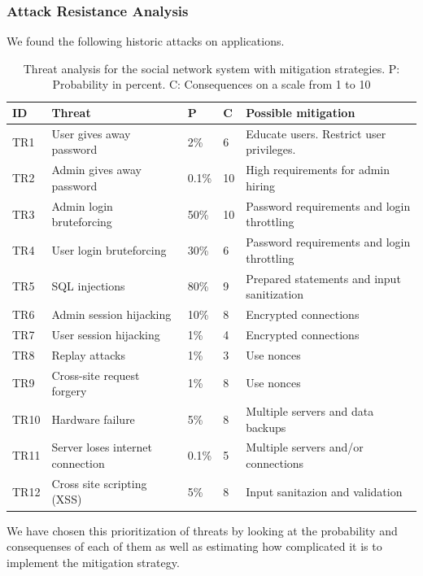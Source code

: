 \documentclass[a4paper]{article}
\begin{document}
\subsubsection{Attack Resistance Analysis}
We found the following historic attacks on applications.

\begin{table}[h!]
	\begin{tabular}{| l | p{4cm} | l | l | p{5cm} |}
		\hline
		\textbf{ID} & \textbf{Threat} & \textbf{P} & \textbf{C} & \textbf{Possible mitigation} \\ \hline
		TR1 & User gives away password & 2\% & 6 & Educate users. Restrict user privileges. \\ \hline
        TR2 & Admin gives away password & 0.1\%  & 10 & High requirements for admin hiring \\ \hline
        TR3 & Admin login bruteforcing & 50\% & 10 & Password requirements and login throttling \\ \hline
        TR4 & User login bruteforcing & 30\% & 6 & Password requirements and login throttling \\ \hline
        TR5 & SQL injections & 80\% & 9 & Prepared statements and input sanitization \\ \hline
        TR6 & Admin session hijacking & 10\% & 8 & Encrypted connections \\ \hline
        TR7 & User session hijacking & 1\% & 4 & Encrypted connections \\ \hline
        TR8 & Replay attacks & 1\% & 3 & Use nonces \\ \hline
       	TR9 & Cross-site request forgery & 1\% & 8 & Use nonces \\ \hline
        TR10 & Hardware failure & 5\% & 8 & Multiple servers and data backups \\ \hline
        TR11 & Server loses internet connection & 0.1\% & 5 & Multiple servers and/or connections \\ \hline
        TR12 & Cross site scripting (XSS) & 5\% & 8 & Input sanitazion and validation \\ \hline
	\end{tabular}
	\caption{Threat analysis for the social network system with mitigation strategies. P: Probability in percent. C: Consequences on a scale from 1 to 10}
		\label{tab:threats}
\end{table}



We have chosen this prioritization of threats by looking at the probability and consequenses of each of them as well as estimating how complicated it is to implement the mitigation strategy.
\end{document}
